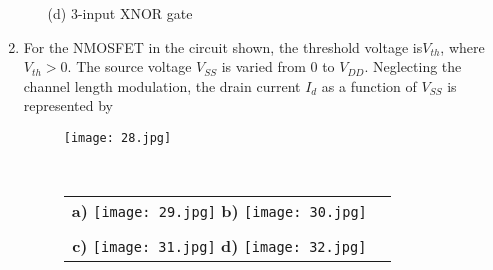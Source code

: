\documentclass[12pt,-letter paper]{article}
\theoremstyle{remark}
\begin{document}
\begin{enumerate}
\begin{minipage}[t]{.5\textwidth}
\begin{itemize}
\item[(d)] 3-input XNOR gate
\end{itemize}
\end{minipage}
\newpage 
\item For the NMOSFET in the circuit shown, the threshold voltage is$V_{th}$, where $V_{th}>0$. The source voltage $V_{SS}$ is varied from $0$
to $V_{DD}$. Neglecting the channel length modulation, the drain current $I_d$
as a function of $V_{SS}$ is represented by
    \begin{figure}[h]
        \centering
        \texttt{[image: 28.jpg]}
    \end{figure}\\
    \begin{figure}[H]
    \centering
    \begin{tabular}{cc}
        \textbf{a)} \texttt{[image: 29.jpg]} \hspace{3cm} %
        \textbf{b)} \texttt{[image: 30.jpg]}   \\     %
        \\ \textbf{c)} \texttt{[image: 31.jpg]} \hspace{3cm} %
        \textbf{d)} \texttt{[image: 32.jpg]}
    \end{tabular}
    \end{figure}
    

\end{enumerate}
\end{document}
